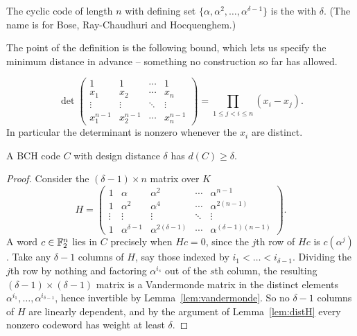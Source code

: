 \documentclass[a4paper]{scrartcl}
\begin{document}
\begin{definition}
	The cyclic code of length $n$ with defining set $\{\alpha,\alpha^2,\dots,\alpha^{\delta-1}\}$ is the  with  $\delta$. (The name is for Bose, Ray-Chaudhuri and Hocquenghem.)
\end{definition}

The point of the definition is the following bound, which lets us specify the minimum distance in advance -- something no construction so far has allowed.

\begin{lemma}[Vandermonde]\label{lem:vandermonde}
	$$\det\begin{pmatrix}
		1 & 1 & \cdots & 1\\
		x_1 & x_2 & \cdots & x_n\\
		\vdots & \vdots & \ddots & \vdots\\
		x_1^{n-1} & x_2^{n-1} & \cdots & x_n^{n-1}
	\end{pmatrix} = \prod_{1\le j<i\le n}(x_i-x_j).$$
	In particular the determinant is nonzero whenever the $x_i$ are distinct.
\end{lemma}

\begin{theorem}
	A BCH code $C$ with design distance $\delta$ has $d(C)\ge\delta$.
\end{theorem}

\begin{proof}
	Consider the $(\delta-1)\times n$ matrix over $K$
	$$H = \begin{pmatrix}
		1 & \alpha & \alpha^2 & \cdots & \alpha^{n-1}\\
		1 & \alpha^2 & \alpha^4 & \cdots & \alpha^{2(n-1)}\\
		\vdots & \vdots & \vdots & \ddots & \vdots\\
		1 & \alpha^{\delta-1} & \alpha^{2(\delta-1)} & \cdots & \alpha^{(\delta-1)(n-1)}
	\end{pmatrix}.$$
	A word $c \in \mathbb{F}_2^n$ lies in $C$ precisely when $Hc = 0$, since the $j$th row of $Hc$ is $c(\alpha^j)$. Take any $\delta-1$ columns of $H$, say those indexed by $i_1<\dots<i_{\delta-1}$. Dividing the $j$th row by nothing and factoring $\alpha^{i_s}$ out of the $s$th column, the resulting $(\delta-1)\times(\delta-1)$ matrix is a Vandermonde matrix in the distinct elements $\alpha^{i_1},\dots,\alpha^{i_{\delta-1}}$, hence invertible by Lemma~\ref{lem:vandermonde}. So no $\delta-1$ columns of $H$ are linearly dependent, and by the argument of Lemma~\ref{lem:distH} every nonzero codeword has weight at least $\delta$.
\end{proof}
\end{document}
